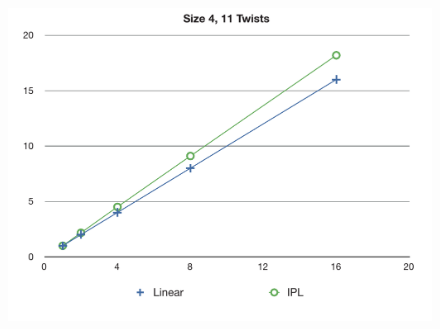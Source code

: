 \documentclass[11pt,a4paper]{article}
\begin{document}
\begin{figure}[h]
\includegraphics[scale=0.5]{figures/4-11.pdf}
\end{figure}
\end{document}
